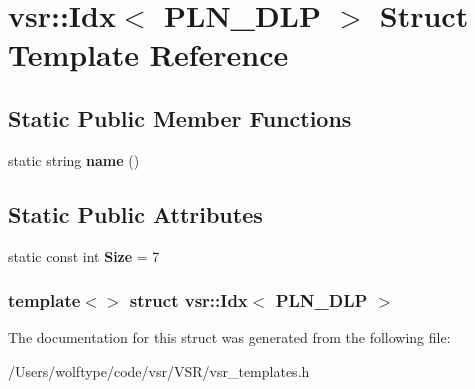 \hypertarget{structvsr_1_1_idx_3_01_p_l_n___d_l_p_01_4}{\section{vsr\-:\-:Idx$<$ P\-L\-N\-\_\-\-D\-L\-P $>$ Struct Template Reference}
\label{structvsr_1_1_idx_3_01_p_l_n___d_l_p_01_4}
}
\subsection*{Static Public Member Functions}
\begin{DoxyCompactItemize}
\item 
\hypertarget{structvsr_1_1_idx_3_01_p_l_n___d_l_p_01_4_abcc75f4e4ca2b147302a388358a6bbaa}{static string {\bfseries name} ()}\label{structvsr_1_1_idx_3_01_p_l_n___d_l_p_01_4_abcc75f4e4ca2b147302a388358a6bbaa}

\end{DoxyCompactItemize}
\subsection*{Static Public Attributes}
\begin{DoxyCompactItemize}
\item 
\hypertarget{structvsr_1_1_idx_3_01_p_l_n___d_l_p_01_4_a31ff284dad58ca816c71b70f270d91c6}{static const int {\bfseries Size} = 7}\label{structvsr_1_1_idx_3_01_p_l_n___d_l_p_01_4_a31ff284dad58ca816c71b70f270d91c6}

\end{DoxyCompactItemize}
\subsubsection*{template$<$$>$ struct vsr\-::\-Idx$<$ P\-L\-N\-\_\-\-D\-L\-P $>$}



The documentation for this struct was generated from the following file\-:\begin{DoxyCompactItemize}
\item 
/\-Users/wolftype/code/vsr/\-V\-S\-R/vsr\-\_\-templates.\-h\end{DoxyCompactItemize}
